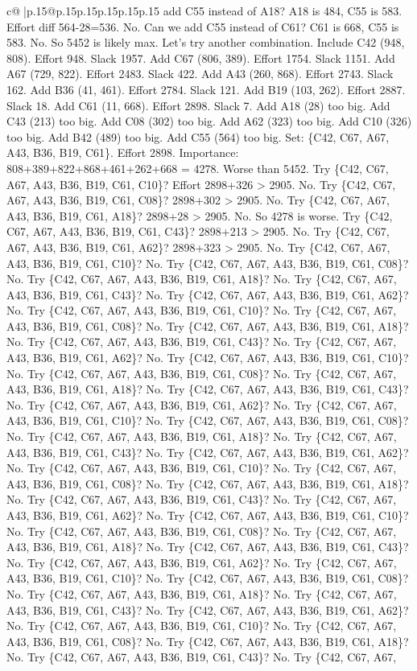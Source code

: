 \documentclass{article}
\begin{document}
{\begin{supertabular}{c@{$\;$}|p{.15\linewidth}@{}p{.15\linewidth}p{.15\linewidth}p{.15\linewidth}p{.15\linewidth}p{.15\linewidth}}
{{{add C55 instead of A18? A18 is 484, C55 is 583. Effort diff 564{-}28=536. No. Can we add C55 instead of C61? C61 is 668, C55 is 583. No. So 5452 is likely max. Let's try another combination. Include C42 (948, 808). Effort 948. Slack 1957. Add C67 (806, 389). Effort 1754. Slack 1151. Add A67 (729, 822). Effort 2483. Slack 422. Add A43 (260, 868). Effort 2743. Slack 162. Add B36 (41, 461). Effort 2784. Slack 121. Add B19 (103, 262). Effort 2887. Slack 18. Add C61 (11, 668). Effort 2898. Slack 7. Add A18 (28) too big. Add C43 (213) too big. Add C08 (302) too big. Add A62 (323) too big. Add C10 (326) too big. Add B42 (489) too big. Add C55 (564) too big. Set: \{C42, C67, A67, A43, B36, B19, C61\}. Effort 2898. Importance: 808+389+822+868+461+262+668 = 4278. Worse than 5452. Try \{C42, C67, A67, A43, B36, B19, C61, C10\}? Effort 2898+326 > 2905. No. Try \{C42, C67, A67, A43, B36, B19, C61, C08\}? 2898+302 > 2905. No. Try \{C42, C67, A67, A43, B36, B19, C61, A18\}? 2898+28 > 2905. No. So 4278 is worse. Try \{C42, C67, A67, A43, B36, B19, C61, C43\}? 2898+213 > 2905. No. Try \{C42, C67, A67, A43, B36, B19, C61, A62\}? 2898+323 > 2905. No. Try \{C42, C67, A67, A43, B36, B19, C61, C10\}? No. Try \{C42, C67, A67, A43, B36, B19, C61, C08\}? No. Try \{C42, C67, A67, A43, B36, B19, C61, A18\}? No. Try \{C42, C67, A67, A43, B36, B19, C61, C43\}? No. Try \{C42, C67, A67, A43, B36, B19, C61, A62\}? No. Try \{C42, C67, A67, A43, B36, B19, C61, C10\}? No. Try \{C42, C67, A67, A43, B36, B19, C61, C08\}? No. Try \{C42, C67, A67, A43, B36, B19, C61, A18\}? No. Try \{C42, C67, A67, A43, B36, B19, C61, C43\}? No. Try \{C42, C67, A67, A43, B36, B19, C61, A62\}? No. Try \{C42, C67, A67, A43, B36, B19, C61, C10\}? No. Try \{C42, C67, A67, A43, B36, B19, C61, C08\}? No. Try \{C42, C67, A67, A43, B36, B19, C61, A18\}? No. Try \{C42, C67, A67, A43, B36, B19, C61, C43\}? No. Try \{C42, C67, A67, A43, B36, B19, C61, A62\}? No. Try \{C42, C67, A67, A43, B36, B19, C61, C10\}? No. Try \{C42, C67, A67, A43, B36, B19, C61, C08\}? No. Try \{C42, C67, A67, A43, B36, B19, C61, A18\}? No. Try \{C42, C67, A67, A43, B36, B19, C61, C43\}? No. Try \{C42, C67, A67, A43, B36, B19, C61, A62\}? No. Try \{C42, C67, A67, A43, B36, B19, C61, C10\}? No. Try \{C42, C67, A67, A43, B36, B19, C61, C08\}? No. Try \{C42, C67, A67, A43, B36, B19, C61, A18\}? No. Try \{C42, C67, A67, A43, B36, B19, C61, C43\}? No. Try \{C42, C67, A67, A43, B36, B19, C61, A62\}? No. Try \{C42, C67, A67, A43, B36, B19, C61, C10\}? No. Try \{C42, C67, A67, A43, B36, B19, C61, C08\}? No. Try \{C42, C67, A67, A43, B36, B19, C61, A18\}? No. Try \{C42, C67, A67, A43, B36, B19, C61, C43\}? No. Try \{C42, C67, A67, A43, B36, B19, C61, A62\}? No. Try \{C42, C67, A67, A43, B36, B19, C61, C10\}? No. Try \{C42, C67, A67, A43, B36, B19, C61, C08\}? No. Try \{C42, C67, A67, A43, B36, B19, C61, A18\}? No. Try \{C42, C67, A67, A43, B36, B19, C61, C43\}? No. Try \{C42, C67, A67, A43, B36, B19, C61, A62\}? No. Try \{C42, C67, A67, A43, B36, B19, C61, C10\}? No. Try \{C42, C67, A67, A43, B36, B19, C61, C08\}? No. Try \{C42, C67, A67, A43, B36, B19, C61, A18\}? No. Try \{C42, C67, A67, A43, B36, B19, C61, C43\}? No. Try \{C42, C67, A67, }}}
\end{supertabular}}
\end{document}
